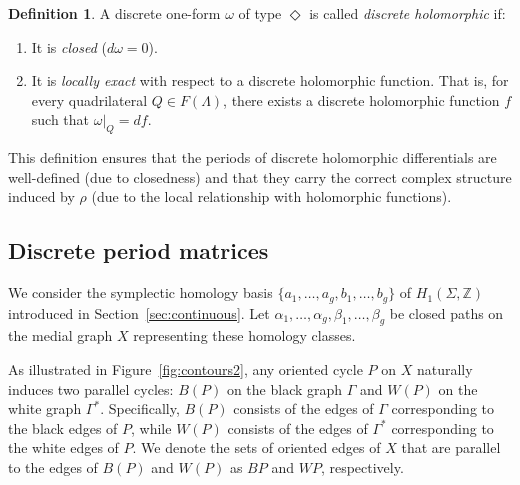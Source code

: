 \documentclass[11pt,a4paper]{article}
\theoremstyle{definition}
\newtheorem*{definition}{Definition}
\newcommand{\Z}{\mathds{Z}}
\begin{document}
\begin{definition}
	A discrete one-form $\omega$ of type $\Diamond$ is called \textit{discrete holomorphic} if:
	\begin{enumerate}
		\item It is \textit{closed} ($d\omega = 0$).
		\item It is \textit{locally exact} with respect to a discrete holomorphic function. That is, for every quadrilateral $Q \in F(\Lambda)$, there exists a discrete holomorphic function $f$ such that $\omega\vert_Q = df$.
	\end{enumerate}
\end{definition}

This definition ensures that the periods of discrete holomorphic differentials are well-defined (due to closedness) and that they carry the correct complex structure induced by $\rho$ (due to the local relationship with holomorphic functions).

\subsection{Discrete period matrices}\label{sec:period}

We consider the symplectic homology basis $\{a_1, \ldots, a_g, b_1, \ldots, b_g\}$ of $H_1(\Sigma,\Z)$ introduced in Section~\ref{sec:continuous}. Let $\alpha_1, \ldots, \alpha_g, \beta_1, \ldots, \beta_g$ be closed paths on the medial graph $X$ representing these homology classes.

As illustrated in Figure~\ref{fig:contours2}, any oriented cycle $P$ on $X$ naturally induces two parallel cycles: $B(P)$ on the black graph $\Gamma$ and $W(P)$ on the white graph $\Gamma^*$. Specifically, $B(P)$ consists of the edges of $\Gamma$ corresponding to the black edges of $P$, while $W(P)$ consists of the edges of $\Gamma^*$ corresponding to the white edges of $P$. We denote the sets of oriented edges of $X$ that are parallel to the edges of $B(P)$ and $W(P)$ as $BP$ and $WP$, respectively.
\end{document}
